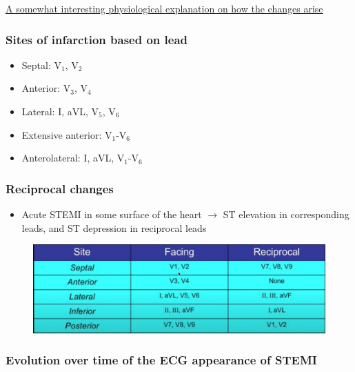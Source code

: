 \documentclass[
  12pt,
]{memoir}
\providecommand{\tightlist}{%
  \setlength{\itemsep}{0pt}\setlength{\parskip}{0pt}}
\begin{document}
\href{https://www.cvphysiology.com/CAD/CAD012}{A somewhat interesting
physiological explanation on how the changes arise}

\hypertarget{sites-of-infarction-based-on-lead}{%
\subsubsection{Sites of infarction based on
lead}\label{sites-of-infarction-based-on-lead}}

\begin{itemize}
\tightlist
\item
  Septal: V\(_1\), V\(_2\)
\item
  Anterior: V\(_3\), V\(_4\)
\item
  Lateral: I, aVL, V\(_5\), V\(_6\)
\item
  Extensive anterior: V\(_1\)-V\(_6\)
\item
  Anterolateral: I, aVL, V\(_1\)-V\(_6\)
\end{itemize}

\hypertarget{reciprocal-changes}{%
\subsubsection{Reciprocal changes}\label{reciprocal-changes}}

\begin{itemize}
\tightlist
\item
  Acute STEMI in some surface of the heart \(\rightarrow\) ST elevation
  in corresponding leads, and ST depression in reciprocal leads
\end{itemize}

\begin{figure}
\centering
\includegraphics[width=.6\textwidth]{../assets/med/reciprocal-leads.jpg}
\end{figure}

\pagebreak

\hypertarget{evolution-over-time-of-the-ecg-appearance-of-stemi}{%
\subsubsection{Evolution over time of the ECG appearance of
STEMI}\label{evolution-over-time-of-the-ecg-appearance-of-stemi}}
\end{document}
